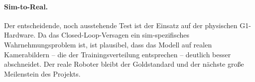 \paragraph{Sim-to-Real.}
Der entscheidende, noch ausstehende Test ist der Einsatz auf der physischen
G1-Hardware. Da das Closed-Loop-Versagen ein sim-spezifisches Wahrnehmungsproblem
ist, ist plausibel, dass das Modell auf realen Kamerabildern -- die der
Trainingsverteilung entsprechen -- deutlich besser abschneidet. Der reale Roboter
bleibt der Goldstandard und der nächste große Meilenstein des Projekts.

